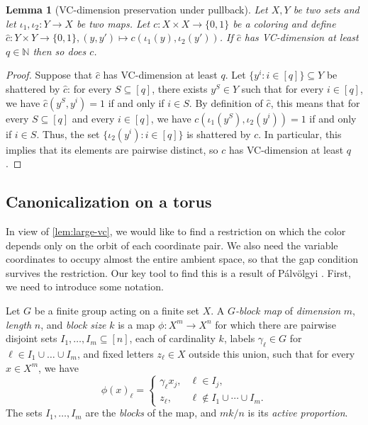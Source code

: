 \documentclass[11pt]{article}
\newtheorem{lemma}[theorem]{Lemma}
\theoremstyle{remark}
\begin{document}
\begin{lemma}[VC-dimension preservation under pullback]\label{lem:transfer-VC-dim}
    Let $X, Y$ be two sets and let $\iota_1, \iota_2 : Y \to X$ be two maps.
    Let $c : X \times X \to \{0, 1\}$ be a coloring and define $\widehat{c} : Y \times Y \to \{0, 1\}, (y, y') \mapsto c(\iota_1(y), \iota_2(y'))$.
    If $\widehat{c}$ has VC-dimension at least $q \in \mathbb{N}$ then so does $c$.
\end{lemma}

\begin{proof}
    Suppose that $\widehat{c}$ has VC-dimension at least $q$.
    Let $\{y^i : i \in [q]\} \subseteq Y$ be shattered by $\widehat{c}$: for every $S \subseteq [q]$, there exists $y^S \in Y$ such that for every $i \in [q]$, we have $\widehat{c}(y^S, y^i) = 1$ if and only if $i \in S$.
    By definition of $\widehat{c}$, this means that for every $S \subseteq [q]$ and every $i \in [q]$, we have $c(\iota_1(y^S), \iota_2(y^i)) = 1$ if and only if $i \in S$.
    Thus, the set $\{\iota_2(y^i) : i \in [q]\}$ is shattered by $c$.
    In particular, this implies that its elements are pairwise distinct, so $c$ has VC-dimension at least $q$.
\end{proof}

\subsection{Canonicalization on a torus}

In view of \cref{lem:large-vc}, we would like to find a restriction on which the color depends only on the orbit of each coordinate pair. 
We also need the variable coordinates to occupy almost the entire ambient space, so that the gap condition survives the restriction.
Our key tool to find this is a result of Pálvölgyi \cite{Palvolgyi26}. First, we need to introduce some notation.

Let $G$ be a finite group acting on a finite set $X$.
A \emph{$G$-block map} of \emph{dimension} $m$, \emph{length} $n$, and \emph{block size} $k$ is a map $\phi : X^m \to X^n$ for which there are pairwise disjoint sets $I_1, \ldots, I_m \subseteq [n]$, each of cardinality $k$, labels $\gamma_{\ell} \in G$ for $\ell \in I_1 \cup \ldots \cup I_m$, and fixed letters $z_\ell \in X$ outside this union, such that for every $x \in X^m$, we have \[
  \phi(x)_\ell=
  \begin{cases}
    \gamma_\ell x_j,&\ell\in I_j,\\
    z_\ell,&\ell\notin I_1\cup\cdots\cup I_m.
  \end{cases}
\]
The sets $I_1,\ldots,I_m$ are the \emph{blocks} of the map, and $mk/n$ is its \emph{active proportion}.
\end{document}
